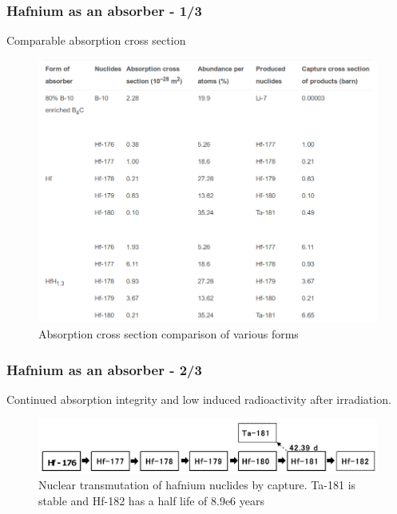 \documentclass[9pt]{beamer}
\begin{document}
\begin{frame}
\frametitle{Hafnium as an absorber - 1/3}
Comparable absorption cross section
\begin{figure}[htbp!]
  \begin{center}
      \includegraphics[scale=0.25]{./images/axs.png}
  \end{center}
  \caption{Absorption cross section comparison of various forms}
  \label{fig:axs}
\end{figure}

\end{frame}

\begin{frame}
\frametitle{Hafnium as an absorber - 2/3}
Continued absorption integrity and low induced radioactivity after irradiation.

\begin{figure}[htbp!]
  \begin{center}
      \includegraphics[scale=0.2]{./images/decay_chain.png}
  \end{center}
  \caption{Nuclear transmutation of hafnium nuclides by capture. Ta-181 is stable and Hf-182
            has a half life of 8.9e6 years}
  \label{fig:dec}
\end{figure}
\end{frame}
\end{document}
